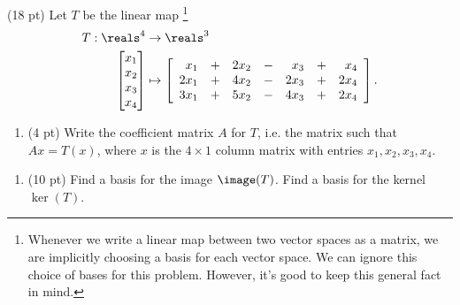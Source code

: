 (18 pt) Let $T$ be the linear map%
\footnote{Whenever we write a linear map between two vector spaces as a matrix, we are implicitly choosing a basis for each vector space. We can ignore this choice of bases for this problem. However, it's good to keep this general fact in mind.}%
\begin{align*}
T
:
\reals^{4}
&\rightarrow
\reals^{3}
\\
\begin{bmatrix}
x_{1}	\\
x_{2}	\\
x_{3}	\\
x_{4}
\end{bmatrix}
&\mapsto
\left[
\begin{array}{r c r c r c r}
x_{1}		&	+	&	2 x_{2}	&	-	&	x_{3}		&	+	&	x_{4}		\\
2 x_{1}	&	+	&	4 x_{2}	&	-	&	2 x_{3}	&	+	&	2 x_{4}	\\
3 x_{1}	&	+	&	5 x_{2}	&	-	&	4 x_{3}	&	+	&	2 x_{4}	
\end{array}
\right].
\end{align*}

\begin{enumerate}[label=(\alph*)]
\item\label{itm : Math211 Summer2019 Exam3 Q3a} (4 pt) Write the coefficient matrix $A$ for $T$, i.e. the matrix such that $A x = T(x)$, where $x$ is the $4 \times 1$ column matrix with entries $x_{1},x_{2},x_{3},x_{4}$. 
\end{enumerate}




\begin{enumerate}[resume,label=(\alph*)]
\item\label{itm : Math211 Summer2019 Exam3 Q3b} (10 pt) Find a basis for the image $\image(T)$. Find a basis for the kernel $\ker(T)$.
\end{enumerate}


